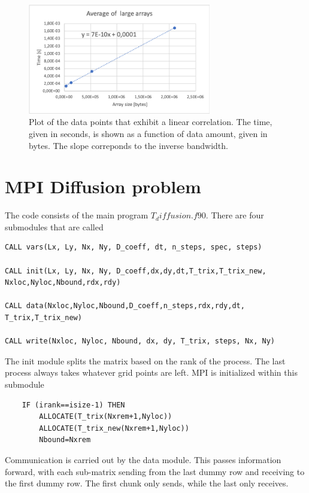 \documentclass{article}
\begin{document}
\begin{figure}[!h]
    \centering
    \includegraphics[width=8cm]{figures/linearplot.png}
    \caption{Plot of the data points that exhibit a linear correlation. The time, given in seconds, is shown as a function of data amount, given in bytes. The slope correponds to the inverse bandwidth.}
    \label{fig:linear}
\end{figure}

\section{MPI Diffusion problem}

The code consists of the main program $T_diffusion.f90$. There are four submodules that are called

\begin{verbatim}
CALL vars(Lx, Ly, Nx, Ny, D_coeff, dt, n_steps, spec, steps)

CALL init(Lx, Ly, Nx, Ny, D_coeff,dx,dy,dt,T_trix,T_trix_new,
Nxloc,Nyloc,Nbound,rdx,rdy)

CALL data(Nxloc,Nyloc,Nbound,D_coeff,n_steps,rdx,rdy,dt,
T_trix,T_trix_new)

CALL write(Nxloc, Nyloc, Nbound, dx, dy, T_trix, steps, Nx, Ny)
\end{verbatim}

The init module splits the matrix based on the rank of the process. The last process always takes whatever grid points are left. MPI is initialized within this submodule

\begin{verbatim}
    IF (irank==isize-1) THEN
        ALLOCATE(T_trix(Nxrem+1,Nyloc))
        ALLOCATE(T_trix_new(Nxrem+1,Nyloc))
        Nbound=Nxrem
\end{verbatim}

Communication is carried out by the data module. This passes information forward, with each sub-matrix sending from the last dummy row and receiving to the first dummy row. The first chunk only sends, while the last only receives. 
\end{document}

